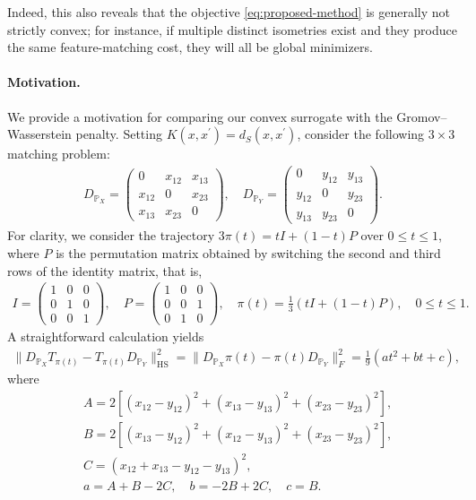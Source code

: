 \documentclass{article}
\begin{document}
Indeed, this also reveals that the objective \eqref{eq:proposed-method} is generally not strictly convex; for instance, if multiple distinct isometries exist and they produce the same feature-matching cost, they will all be global minimizers.

\paragraph{Motivation.}  
We provide a motivation for comparing our convex surrogate with the Gromov--Wasserstein penalty.  
Setting $K(x,x^\prime)=d_S(x,x^\prime)$, consider the following $3 \times 3$ matching problem:
\begin{align*}
	D_{\mathbb{P}_X} = \begin{pmatrix}
		0 & x_{12} & x_{13} \\
		x_{12} & 0 & x_{23} \\
		x_{13} & x_{23} & 0
	\end{pmatrix} , 
	\quad
	D_{\mathbb{P}_Y} = \begin{pmatrix}
		0 & y_{12} & y_{13} \\
		y_{12} & 0 & y_{23} \\
		y_{13} & y_{23} & 0
	\end{pmatrix} .
\end{align*}
For clarity, we consider the trajectory $3\pi(t) = tI + (1-t)P$ over $0 \leq t \leq 1$,  
where $P$ is the permutation matrix obtained by switching the second and third rows of the identity matrix, that is,
\begin{align*}
	I = \begin{pmatrix}
		1 & 0 & 0 \\
		0 & 1 & 0 \\
		0 & 0 & 1
	\end{pmatrix} , \quad
	P = \begin{pmatrix}
		1 & 0 & 0 \\
		0 & 0 & 1 \\
		0 & 1 & 0
	\end{pmatrix} , \quad
	\pi(t) = \frac{1}{3} \left(tI + (1-t)P\right) , \quad 0 \leq t \leq 1 . 
\end{align*} 
A straightforward calculation yields
\begin{align*}
	\|D_{\mathbb{P}_X}T_{\pi(t)} - T_{\pi(t)}D_{\mathbb{P}_Y} \|_{\mathrm{HS}}^2 = \| D_{\mathbb{P}_X}\pi(t) - \pi(t)D_{\mathbb{P}_Y} \|_F^2 = \frac{1}{9}(at^2 + bt + c) ,
\end{align*}
where
\begin{align*}
	&A = 2\left[(x_{12} - y_{12})^2 + (x_{13} - y_{13})^2 + (x_{23} - y_{23})^2\right] , \\
	&B = 2\left[(x_{13} - y_{12})^2 + (x_{12} - y_{13})^2 + (x_{23} - y_{23})^2\right] , \\
	&C = (x_{12} + x_{13} - y_{12} - y_{13})^2 , \\[5pt]
	&a = A + B - 2C , \quad b = -2B + 2C , \quad c = B .
\end{align*}
\end{document}
